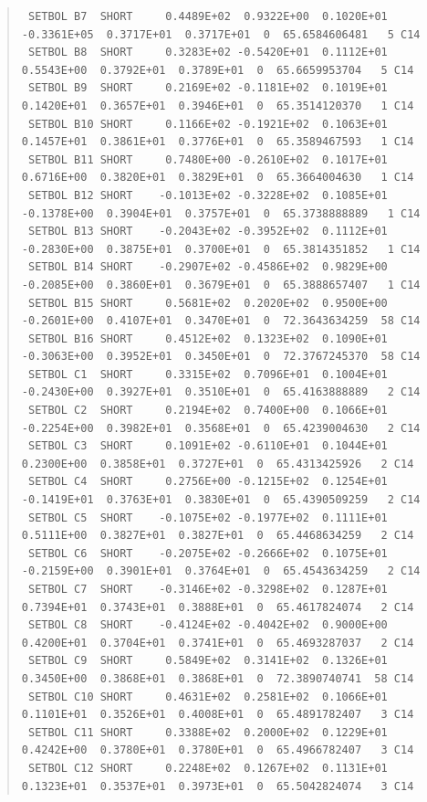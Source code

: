 \documentclass[twoside,11pt]{article}
\newenvironment{myquote}{\begin{quote}\begin{small}}{\end{small}\end{quote}}
\renewcommand{\_}{\texttt{\symbol{95}}}
\begin{document}
\begin{landscape}
\begin{myquote}
\begin{verbatim}
 SETBOL B7  SHORT     0.4489E+02  0.9322E+00  0.1020E+01 -0.3361E+05  0.3717E+01  0.3717E+01  0  65.6584606481   5 C14
 SETBOL B8  SHORT     0.3283E+02 -0.5420E+01  0.1112E+01  0.5543E+00  0.3792E+01  0.3789E+01  0  65.6659953704   5 C14
 SETBOL B9  SHORT     0.2169E+02 -0.1181E+02  0.1019E+01  0.1420E+01  0.3657E+01  0.3946E+01  0  65.3514120370   1 C14
 SETBOL B10 SHORT     0.1166E+02 -0.1921E+02  0.1063E+01  0.1457E+01  0.3861E+01  0.3776E+01  0  65.3589467593   1 C14
 SETBOL B11 SHORT     0.7480E+00 -0.2610E+02  0.1017E+01  0.6716E+00  0.3820E+01  0.3829E+01  0  65.3664004630   1 C14
 SETBOL B12 SHORT    -0.1013E+02 -0.3228E+02  0.1085E+01 -0.1378E+00  0.3904E+01  0.3757E+01  0  65.3738888889   1 C14
 SETBOL B13 SHORT    -0.2043E+02 -0.3952E+02  0.1112E+01 -0.2830E+00  0.3875E+01  0.3700E+01  0  65.3814351852   1 C14
 SETBOL B14 SHORT    -0.2907E+02 -0.4586E+02  0.9829E+00 -0.2085E+00  0.3860E+01  0.3679E+01  0  65.3888657407   1 C14
 SETBOL B15 SHORT     0.5681E+02  0.2020E+02  0.9500E+00 -0.2601E+00  0.4107E+01  0.3470E+01  0  72.3643634259  58 C14
 SETBOL B16 SHORT     0.4512E+02  0.1323E+02  0.1090E+01 -0.3063E+00  0.3952E+01  0.3450E+01  0  72.3767245370  58 C14
 SETBOL C1  SHORT     0.3315E+02  0.7096E+01  0.1004E+01 -0.2430E+00  0.3927E+01  0.3510E+01  0  65.4163888889   2 C14
 SETBOL C2  SHORT     0.2194E+02  0.7400E+00  0.1066E+01 -0.2254E+00  0.3982E+01  0.3568E+01  0  65.4239004630   2 C14
 SETBOL C3  SHORT     0.1091E+02 -0.6110E+01  0.1044E+01  0.2300E+00  0.3858E+01  0.3727E+01  0  65.4313425926   2 C14
 SETBOL C4  SHORT     0.2756E+00 -0.1215E+02  0.1254E+01 -0.1419E+01  0.3763E+01  0.3830E+01  0  65.4390509259   2 C14
 SETBOL C5  SHORT    -0.1075E+02 -0.1977E+02  0.1111E+01  0.5111E+00  0.3827E+01  0.3827E+01  0  65.4468634259   2 C14
 SETBOL C6  SHORT    -0.2075E+02 -0.2666E+02  0.1075E+01 -0.2159E+00  0.3901E+01  0.3764E+01  0  65.4543634259   2 C14
 SETBOL C7  SHORT    -0.3146E+02 -0.3298E+02  0.1287E+01  0.7394E+01  0.3743E+01  0.3888E+01  0  65.4617824074   2 C14
 SETBOL C8  SHORT    -0.4124E+02 -0.4042E+02  0.9000E+00  0.4200E+01  0.3704E+01  0.3741E+01  0  65.4693287037   2 C14
 SETBOL C9  SHORT     0.5849E+02  0.3141E+02  0.1326E+01  0.3450E+00  0.3868E+01  0.3868E+01  0  72.3890740741  58 C14
 SETBOL C10 SHORT     0.4631E+02  0.2581E+02  0.1066E+01  0.1101E+01  0.3526E+01  0.4008E+01  0  65.4891782407   3 C14
 SETBOL C11 SHORT     0.3388E+02  0.2000E+02  0.1229E+01  0.4242E+00  0.3780E+01  0.3780E+01  0  65.4966782407   3 C14
 SETBOL C12 SHORT     0.2248E+02  0.1267E+02  0.1131E+01  0.1323E+01  0.3537E+01  0.3973E+01  0  65.5042824074   3 C14

\end{verbatim}
\end{myquote}
\end{landscape}
\end{document}
